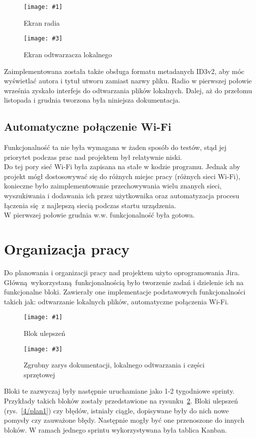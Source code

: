 \documentclass[polish]{aghengthesis}
\newcommand{\imgintss}[5]{
	\begin{figure}[{#5}]
		\centering
		\begin{minipage}{.45\textwidth}
			\centering
			\texttt{[image: \#1]}
			\caption{#2}
			\label{#1}
		\end{minipage}%
		\hfill
		\begin{minipage}{.45\textwidth}
			\centering
			\texttt{[image: \#3]}
			\caption{#4}
			\label{#3}
		\end{minipage}
	\end{figure}
}
\newcommand{\imghss}[4]{\imgintss{#1}{#2}{#3}{#4}{H}}
\begin{document}
			\imghss{4/scr_radio}{Ekran radia}{4/scr_player}{Ekran odtwarzacza lokalnego}
			
			Zaimplementowana została także obsługa formatu metadanych ID3v2, aby móc wyświetlać autora i tytuł utworu zamiast nazwy pliku. Radio w pierwszej połowie września zyskało interfejs do odtwarzania plików lokalnych. Dalej, aż do przełomu listopada i grudnia tworzona była niniejsza dokumentacja.
			
		\subsection{Automatyczne połączenie Wi-Fi}
			Funkcjonalność ta nie była wymagana w żaden sposób do testów, stąd jej priorytet podczas prac nad projektem był relatywnie niski. 
			$ $\\

			 Do tej pory sieć Wi-Fi była zapisana na stałe w kodzie programu.  Jednak aby projekt mógł dostosowywać się do różnych miejsc pracy (różnych sieci Wi-Fi), konieczne było zaimplementowanie przechowywania wielu znanych sieci, wyszukiwania i dodawania ich przez użytkownika oraz automatyzacja procesu łączenia się z najlepszą siecią podczas startu urządzenia.
			 $ $\\
			 
			 W pierwszej połowie grudnia w.w. funkcjonalność była gotowa.
			 
	 \section{Organizacja pracy}
		Do planowania i organizacji pracy nad projektem użyto oprogramowania Jira. Główną wykorzystaną funkcjonalnością było tworzenie zadań i dzielenie ich na funkcjonalne bloki. Zawierały one implementacje podstawowych funkcjonalności takich jak: odtwarzanie lokalnych plików, automatyczne połączenia Wi-Fi.
		
		\imghss{4/plan1}{Blok ulepszeń}{4/plan2}{Zgrubny zarys dokumentacji, lokalnego odtwarzania i części sprzętowej}
		
		Bloki te zazwyczaj były następnie uruchamiane jako 1-2 tygodniowe sprinty. Przykłady takich bloków zostały przedstawione na rysunku~\ref{4/plan2}. Bloki ulepszeń (rys.~\ref{4/plan1}) czy błędów, istniały ciągle, dopisywane były do nich nowe pomysły czy zauważone błędy. Następnie mogły być one przenoszone do innych bloków.
		W ramach jednego sprintu wykorzystywana była tablica Kanban.
		 $ $\\
		 
\end{document}
